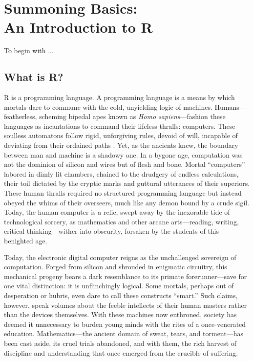 \chapter[Summoning Basics: An Introduction to R]{Summoning Basics:\\ \huge An Introduction to R}

To begin with ...

\section[What is R?]{What is R?}

\lettrine{R}{ } is a \gls{programming language}. A programming language is a means by which mortals dare to commune with the cold, unyielding logic of machines. Humans—featherless, scheming bipedal apes known as \textit{Homo sapiens}—fashion these languages as incantations to command their lifeless thralls: computers. These soulless automatons follow rigid, unforgiving rules, devoid of will, incapable of deviating from their ordained paths \parencite{Turing1950}. Yet, as the ancients knew, the boundary between man and machine is a shadowy one. In a bygone age, computation was not the dominion of silicon and wires but of flesh and bone. Mortal “computers” labored in dimly lit chambers, chained to the drudgery of endless calculations, their toil dictated by the cryptic marks and guttural utterances of their superiors. These human thralls required no structured programming language but instead obeyed the whims of their overseers, much like any demon bound by a crude sigil. Today, the human computer is a relic, swept away by the inexorable tide of technological sorcery, as mathematics and other arcane arts—reading, writing, critical thinking—wither into obscurity, forsaken by the students of this benighted age.

Today, the electronic digital computer reigns as the unchallenged sovereign of computation. Forged from silicon and shrouded in enigmatic circuitry, this mechanical progeny bears a dark resemblance to its primate forerunner—save for one vital distinction: it is unflinchingly logical. Some mortals, perhaps out of desperation or hubris, even dare to call these constructs ``smart.'' Such claims, however, speak volumes about the feeble intellects of their human masters rather than the devices themselves. With these machines now enthroned, society has deemed it unnecessary to burden young minds with the rites of a once-venerated education. Mathematics—the ancient domain of sweat, tears, and torment—has been cast aside, its cruel trials abandoned, and with them, the rich harvest of discipline and understanding that once emerged from the crucible of suffering.

